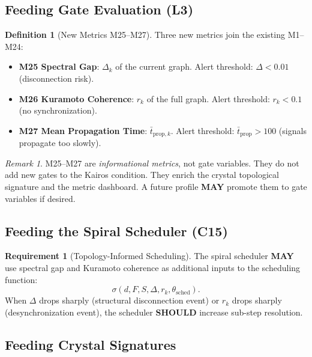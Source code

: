 \documentclass[11pt,a4paper,twoside]{article}
\theoremstyle{definition}
\newtheorem{definition}{Definition}[section]
\newtheorem{requirement}{Requirement}[section]
\theoremstyle{plain}
\theoremstyle{remark}
\newtheorem{remark}{Remark}[section]
\begin{document}
\subsection{Feeding Gate Evaluation (L3)}

\begin{definition}[New Metrics M25--M27]\label{def:newmetrics}
Three new metrics join the existing M1--M24:
\begin{itemize}[nosep]
  \item \textbf{M25 Spectral Gap}: $\Delta_k$ of the current graph.
        Alert threshold: $\Delta < 0.01$ (disconnection risk).
  \item \textbf{M26 Kuramoto Coherence}: $r_k$ of the full graph.
        Alert threshold: $r_k < 0.1$ (no synchronization).
  \item \textbf{M27 Mean Propagation Time}: $\bar{t}_{\mathrm{prop},k}$.
        Alert threshold: $\bar{t}_{\mathrm{prop}} > 100$ (signals
        propagate too slowly).
\end{itemize}
\end{definition}

\begin{remark}
M25--M27 are \emph{informational metrics}, not gate variables. They do
not add new gates to the Kairos condition. They enrich the crystal
topological signature and the metric dashboard. A future profile
\textbf{MAY} promote them to gate variables if desired.
\end{remark}

\subsection{Feeding the Spiral Scheduler (C15)}

\begin{requirement}[Topology-Informed Scheduling]\label{req:toposched}
The spiral scheduler \textbf{MAY} use spectral gap and Kuramoto
coherence as additional inputs to the scheduling function:
\[
  \sigma(d, F, S, \Delta, r_k, \theta_{\mathrm{sched}}).
\]
When $\Delta$ drops sharply (structural disconnection event) or $r_k$
drops sharply (desynchronization event), the scheduler \textbf{SHOULD}
increase sub-step resolution.
\end{requirement}

\subsection{Feeding Crystal Signatures}
\end{document}

